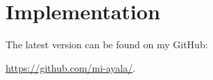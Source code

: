 \newpage
\part{Implementation}

The latest version can be found on my GitHub:

\url{https://github.com/mi-ayala/}.



